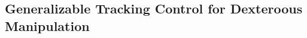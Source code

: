 







\vspace{-5pt}
\subsection{Generalizable Tracking Control for Dexteroous Manipulation } \label{sec:exp_results}
\vspace{-5pt}



